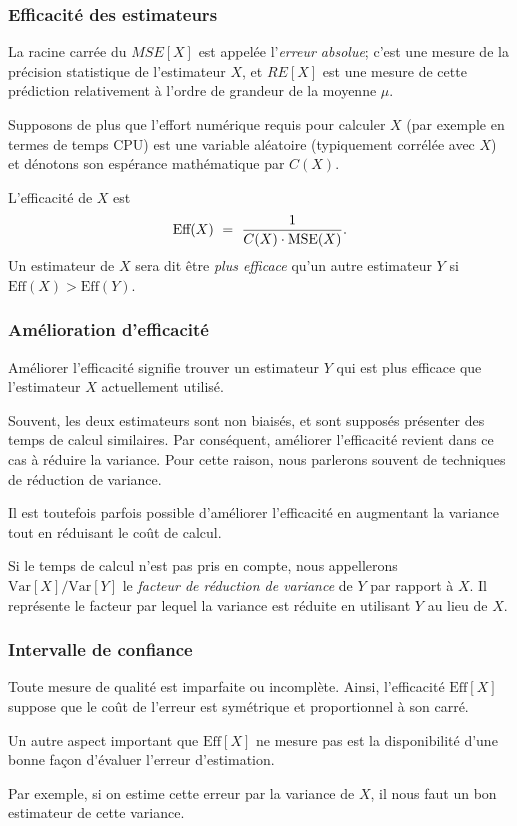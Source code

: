 \documentclass[t,usepdftitle=false]{beamer}
\def\MSE{\mbox{MSE}}
\def\eff{\mbox{Eff}}
\def\Var{\mbox{Var}}
\begin{document}
\begin{frame}
\frametitle{Efficacité des estimateurs}

La racine carrée du $MSE[X]$ est appelée l'{\em erreur absolue};
c'est une mesure de la précision statistique de l'estimateur $X$,
et $RE[X]$ est une mesure de cette prédiction relativement à
l'ordre de grandeur de la moyenne $\mu$.

\mbox{}

Supposons de plus que l'effort numérique requis pour calculer
$X$ (par exemple en termes de temps CPU) est une variable aléatoire
(typiquement corrélée avec $X$) et dénotons son espérance
mathématique par $C(X)$.

\mbox{}

L'efficacité de $X$ est
\begin{equation}
  \eff(X) ~=~ {1\over C(X) \cdot \MSE(X)}.                 \label{eq:eff}
\end{equation}
Un estimateur de $X$ sera dit être {\em plus efficace\/} qu'un autre
estimateur $Y$ si $\eff(X) > \eff(Y)$.

\end{frame}

\begin{frame}
\frametitle{Amélioration d'efficacité}

Améliorer l'efficacité signifie trouver un estimateur $Y$ qui est plus efficace que l'estimateur $X$ actuellement utilisé.

\mbox{}

Souvent, les deux estimateurs sont non biaisés, et sont supposés
présenter des temps de calcul similaires.
Par conséquent, améliorer l'efficacité revient dans ce cas à réduire la
variance.
Pour cette raison, nous parlerons souvent de techniques de réduction
de variance.

\mbox{}

Il est toutefois parfois possible d'améliorer l'efficacité en
augmentant la variance tout en réduisant le coût de calcul.

\mbox{}

Si le temps de calcul n'est pas pris en compte, nous appellerons
$\Var[X]/\Var[Y]$ le \emph{facteur de réduction de
  variance} de $Y$
par rapport à $X$.
Il représente le facteur par lequel la variance est réduite en
utilisant $Y$ au lieu de $X$.

\end{frame}

\begin{frame}
\frametitle{Intervalle de confiance}

Toute mesure de qualité est imparfaite ou incomplète. Ainsi,
l'efficacité $\eff[X]$ suppose que le coût de l'erreur est symétrique 
et proportionnel à son carré. 

\mbox{}

Un autre aspect important que $\eff[X]$ ne mesure pas est la disponibilité d'une bonne façon d'évaluer l'erreur d'estimation.

\mbox{}

Par exemple, si on estime cette erreur par la variance de $X$, 
il nous faut un bon estimateur de cette variance.

\end{frame}
\end{document}
